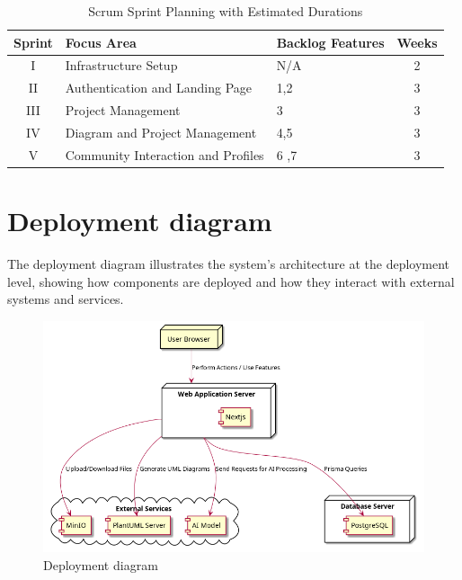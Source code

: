 \begin{table}[h!]
    \centering
    \begin{tabular}{|c|l|l|c|}
        \hline
        \textbf{Sprint} & \textbf{Focus Area}                                & \textbf{Backlog Features}                                   & \textbf{Weeks} \\ \hline
        I              & Infrastructure Setup                               & N/A                                                     & 2                                   \\ \hline
        II             & Authentication and Landing Page                    & 1,2                              & 3                                 \\ \hline
        III            & Project Management                                 & 3                            & 3                                   \\ \hline
        IV             & Diagram and Project Management                     & 4,5                            & 3                                   \\ \hline
        V              & Community Interaction and Profiles                 & 6 ,7                          & 3                                   \\ \hline
    \end{tabular}
    \caption{Scrum Sprint Planning with Estimated Durations}
\end{table}

\section{Deployment diagram}

The deployment diagram illustrates the system's architecture at the deployment level, showing how components are deployed and how they interact with external systems and services.

\begin{figure}[H]
    \centering
    \includegraphics[width=\textwidth]{./conception/deployement_diagram.png}
    \caption{Deployment diagram}
    \label{fig:deployment}
\end{figure}


